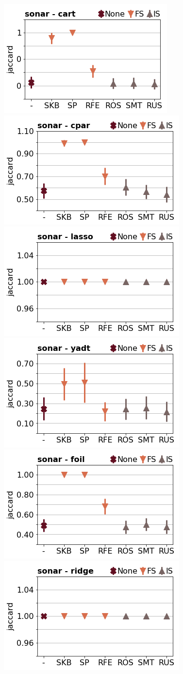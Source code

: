 \documentclass[runningheads,a4paper]{llncs}
\begin{document}
\begin{figure}[!h]
\includegraphics[width=0.32\linewidth]{fig/preps_sonar_DT_sklearn_jaccard.png}
\includegraphics[width=0.32\linewidth]{fig/preps_sonar_RB_cpar_jaccard.png}
\includegraphics[width=0.32\linewidth]{fig/preps_sonar_LM_lasso_jaccard.png}
\includegraphics[width=0.32\linewidth]{fig/preps_sonar_DT_yadt_jaccard.png}
\includegraphics[width=0.32\linewidth]{fig/preps_sonar_RB_foil_jaccard.png}
\includegraphics[width=0.32\linewidth]{fig/preps_sonar_LM_ridge_jaccard.png}
\end{figure}
\end{document}
